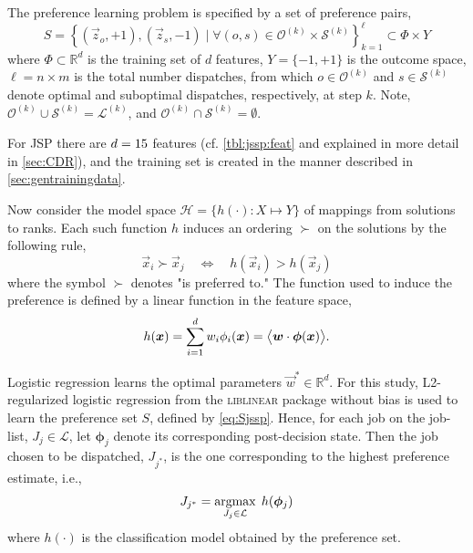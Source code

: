 \documentclass[smallextended]{svjour3}
\renewcommand{\vphi}{\bm{\phi}}
\begin{document}
The preference learning problem is specified by a set of preference pairs,
\begin{equation}
	S = 
	\left\{\left(\vec{z}_o,+1\right),\left(\vec{z}_s,-1\right)
	\;|\;\forall (o,s) \in \mathcal{O}^{(k)} \times \mathcal{S}^{(k)}
	\right\}_{k=1}^{\ell} \subset \Phi\times Y \label{eq:Sjssp}
\end{equation}
where $\Phi\subset \mathbb{R}^d$ is the training set of $d$ features,  
$Y=\{-1,+1\}$ is the outcome space, $\ell=n\times m$ is the total number 
dispatches, from which $o\in\mathcal{O}^{(k)}$ and $s\in \mathcal{S}^{(k)}$ 
denote optimal and suboptimal dispatches, respectively, at step $k$. 
Note, $\mathcal{O}^{(k)}\cup\mathcal{S}^{(k)}=\mathcal{L}^{(k)}$, and 
$\mathcal{O}^{(k)}\cap\mathcal{S}^{(k)}=\emptyset$. 

For JSP there are $d=15$ features (cf. \cref{tbl:jssp:feat} and 
explained in more detail in \cref{sec:CDR}), and the training set is created in 
the manner described in \cref{sec:gentrainingdata}.

Now consider the model space $\mathcal{H} = \{h(\cdot) : X \mapsto Y\}$ of 
mappings from solutions to ranks. Each such function $h$ induces an ordering 
$\succ$ on the solutions  by the following rule,
\begin{equation}\label{eq:linear}
	\vec{x}_i \succ \vec{x}_j \quad \Leftrightarrow \quad h(\vec{x}_i) > 
	h(\vec{x}_j)
\end{equation}
where the symbol $\succ$ denotes "is preferred to."  The function used to 
induce the preference is defined by a linear function in the feature space,
\begin{equation}\label{eq:jssp:linweights}
	h(\vec{x})=\sum_{i=1}^d w_i\phi_i(\vec{x})=\inner{\vec{w}}{\vphi(\vec{x})}.
\end{equation}

Logistic regression learns the optimal parameters $\vec{w}^*\in\mathbb{R}^d$. 
For this study, L2-regularized logistic regression from the \textsc{liblinear} 
package \citep{liblinear} without bias is used to learn the preference set $S$, 
defined by \eqref{eq:Sjssp}.
Hence, for each job on the job-list, $J_j\in\mathcal{L}$, let $\vphi_j$ denote 
its corresponding  post-decision state. Then the job chosen to be dispatched, 
$J_{j^*}$, is the one corresponding to the highest preference estimate, i.e.,
\begin{equation}\label{eq:lin}
	J_{j^*}=\argmax_{J_j\in \mathcal{L}}\; h(\vphi_j)
\end{equation}
where $h(\cdot)$ is the classification model obtained by the preference set.
\end{document}
